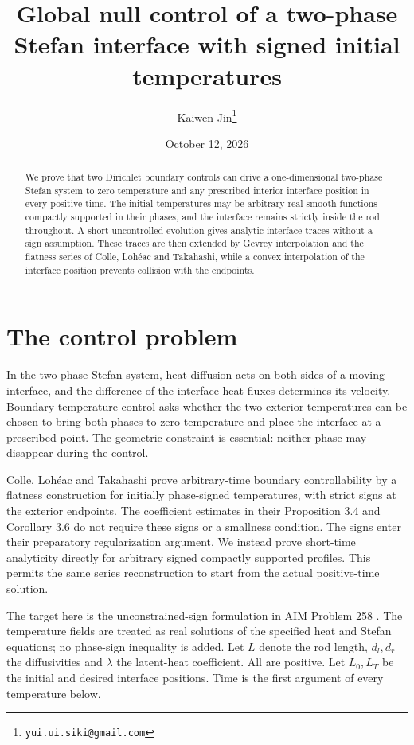 \documentclass[11pt]{article}
\title{Global null control of a two-phase Stefan interface with signed initial temperatures}
\author{Kaiwen Jin\thanks{\texttt{yui.ui.siki@gmail.com}}}
\date{October 12, 2026}
\begin{document}
\maketitle

\begin{abstract}
We prove that two Dirichlet boundary controls can drive a one-dimensional
two-phase Stefan system to zero temperature and any prescribed interior
interface position in every positive time. The initial temperatures may be
arbitrary real smooth functions compactly supported in their phases, and the
interface remains strictly inside the rod throughout. A short uncontrolled
evolution gives analytic interface traces without a sign assumption. These
traces are then extended by Gevrey interpolation and the flatness series of
Colle, Loh\'eac and Takahashi, while a convex interpolation of the interface
position prevents collision with the endpoints.
\end{abstract}

\section{The control problem}
In the two-phase Stefan system, heat diffusion acts on both sides of a
moving interface, and the difference of the interface heat fluxes determines
its velocity. Boundary-temperature control asks whether the two exterior
temperatures can be chosen to bring both phases to zero temperature and
place the interface at a prescribed point. The geometric constraint is
essential: neither phase may disappear during the control.

Colle, Loh\'eac and Takahashi \cite[Theorem 1.1]{CLT} prove arbitrary-time
boundary controllability by a flatness construction for initially
phase-signed temperatures, with strict signs at the exterior endpoints.
The coefficient estimates in their Proposition 3.4 and Corollary 3.6
do not require these signs or a smallness condition. The signs enter their
preparatory regularization argument. We instead prove short-time
analyticity directly for arbitrary signed compactly supported profiles.
This permits the same series reconstruction to start from the actual
positive-time solution.

The target here is the unconstrained-sign formulation in AIM Problem 258
\cite{AIM258}. The temperature fields are treated as real solutions of the
specified heat and Stefan equations; no phase-sign inequality is added.
Let $L$ denote the rod length, $d_l,d_r$ the diffusivities and $\lambda$
the latent-heat coefficient. All are positive. Let $L_0,L_T$ be the initial
and desired interface positions. Time is the first argument of every
temperature below.
\end{document}
